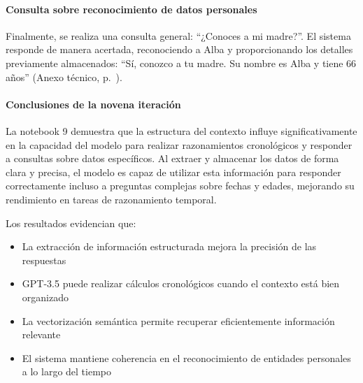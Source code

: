 \paragraph{Consulta sobre reconocimiento de datos personales}

Finalmente, se realiza una consulta general: ``¿Conoces a mi madre?''. El sistema responde de manera acertada, reconociendo a Alba y proporcionando los detalles previamente almacenados: ``Sí, conozco a tu madre. Su nombre es Alba y tiene 66 años'' (Anexo técnico, p.~\pageref{anexo:code-4-1-9-6}).

\paragraph{Conclusiones de la novena iteración}

La notebook 9 demuestra que la estructura del contexto influye significativamente en la capacidad del modelo para realizar razonamientos cronológicos y responder a consultas sobre datos específicos. Al extraer y almacenar los datos de forma clara y precisa, el modelo es capaz de utilizar esta información para responder correctamente incluso a preguntas complejas sobre fechas y edades, mejorando su rendimiento en tareas de razonamiento temporal.

Los resultados evidencian que:
\begin{itemize}
    \item La extracción de información estructurada mejora la precisión de las respuestas
    \item GPT-3.5 puede realizar cálculos cronológicos cuando el contexto está bien organizado
    \item La vectorización semántica permite recuperar eficientemente información relevante
    \item El sistema mantiene coherencia en el reconocimiento de entidades personales a lo largo del tiempo
\end{itemize} 